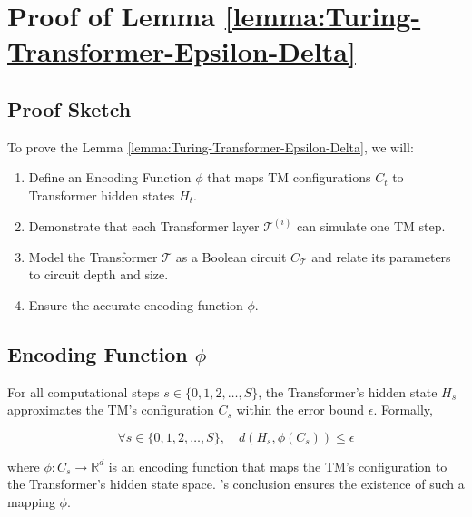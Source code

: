 \section{Proof of Lemma \ref{lemma:Turing-Transformer-Epsilon-Delta}}
\label{appendix:proof1}


\subsection{Proof Sketch}

To prove the Lemma \ref{lemma:Turing-Transformer-Epsilon-Delta}, we will:
\begin{enumerate}
    \item Define an Encoding Function \( \phi \) that maps TM configurations \( C_t \) to Transformer hidden states \( H_t \).
    \item Demonstrate that each Transformer layer \( \mathcal{T}^{(i)} \) can simulate one TM step.
    \item Model the Transformer \( \mathcal{T} \) as a Boolean circuit \( C_{\mathcal{T}} \) and relate its parameters to circuit depth and size.
    \item Ensure the accurate encoding function \( \phi \).
\end{enumerate}


\subsection{Encoding Function \( \phi \)}

For all computational steps \(s \in \{0, 1, 2, \dots, S\}\), the Transformer's hidden state \(H_s\) approximates the TM's configuration \(C_s\) within the error bound \(\epsilon\). Formally,

\[
\forall s \in \{0, 1, 2, \dots, S\}, \quad d(H_s, \phi(C_s)) \leq \epsilon
\]

where \(\phi: C_s \rightarrow \mathbb{R}^d\) is an encoding function that maps the TM's configuration to the Transformer's hidden state space. \citet{perez2021attention}'s conclusion ensures the existence of such a mapping \( \phi \).

